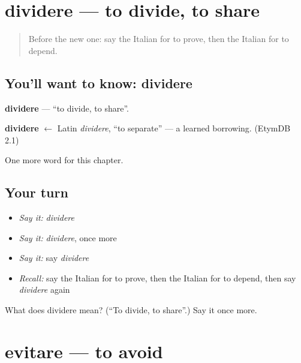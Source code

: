 \section[dividere]{dividere — to divide, to share}

\label{lesson:IT-C179-dividere}



\begin{quote}
Before the new one: say the Italian for to prove, then the Italian for to depend.
\end{quote}

\subsection*{You'll want to know: dividere}
\textbf{dividere} — \textquotedblleft{}to divide, to share\textquotedblright{}.

\begin{cousinweb}
\textbf{dividere} $\leftarrow$ Latin \emph{dividere}, \textquotedblleft{}to separate\textquotedblright{} — a learned borrowing. (EtymDB 2.1)
\end{cousinweb}

\begin{grammarlens}[title={What you've built}]
One more word for this chapter.
\end{grammarlens}

\subsection*{Your turn}
\begin{itemize}
\raggedright
  \item \emph{Say it:} \emph{dividere}
  \item \emph{Say it:} \emph{dividere}, once more
  \item \emph{Say it:} say \emph{dividere}
  \item \emph{Recall:} say the Italian for to prove, then the Italian for to depend, then say \emph{dividere} again
\end{itemize}

\begin{tcolorbox}[breakable,colback=teal!4,colframe=teal!35!black,title={Before you move on}]
What does dividere mean? (\textquotedblleft{}To divide, to share\textquotedblright{}.) Say it once more.
\end{tcolorbox}
\section[evitare]{evitare — to avoid}

